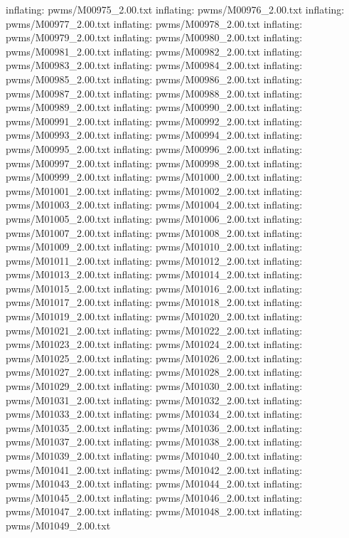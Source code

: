 \documentclass[letterpaper,10pt,english]{sphinxmanual}
\begin{document}
{\begin{sphinxVerbatim}[commandchars=\\\{\}]
  inflating: pwms/M00975\_2.00.txt
  inflating: pwms/M00976\_2.00.txt
  inflating: pwms/M00977\_2.00.txt
  inflating: pwms/M00978\_2.00.txt
  inflating: pwms/M00979\_2.00.txt
  inflating: pwms/M00980\_2.00.txt
  inflating: pwms/M00981\_2.00.txt
  inflating: pwms/M00982\_2.00.txt
  inflating: pwms/M00983\_2.00.txt
  inflating: pwms/M00984\_2.00.txt
  inflating: pwms/M00985\_2.00.txt
  inflating: pwms/M00986\_2.00.txt
  inflating: pwms/M00987\_2.00.txt
  inflating: pwms/M00988\_2.00.txt
  inflating: pwms/M00989\_2.00.txt
  inflating: pwms/M00990\_2.00.txt
  inflating: pwms/M00991\_2.00.txt
  inflating: pwms/M00992\_2.00.txt
  inflating: pwms/M00993\_2.00.txt
  inflating: pwms/M00994\_2.00.txt
  inflating: pwms/M00995\_2.00.txt
  inflating: pwms/M00996\_2.00.txt
  inflating: pwms/M00997\_2.00.txt
  inflating: pwms/M00998\_2.00.txt
  inflating: pwms/M00999\_2.00.txt
  inflating: pwms/M01000\_2.00.txt
  inflating: pwms/M01001\_2.00.txt
  inflating: pwms/M01002\_2.00.txt
  inflating: pwms/M01003\_2.00.txt
  inflating: pwms/M01004\_2.00.txt
  inflating: pwms/M01005\_2.00.txt
  inflating: pwms/M01006\_2.00.txt
  inflating: pwms/M01007\_2.00.txt
  inflating: pwms/M01008\_2.00.txt
  inflating: pwms/M01009\_2.00.txt
  inflating: pwms/M01010\_2.00.txt
  inflating: pwms/M01011\_2.00.txt
  inflating: pwms/M01012\_2.00.txt
  inflating: pwms/M01013\_2.00.txt
  inflating: pwms/M01014\_2.00.txt
  inflating: pwms/M01015\_2.00.txt
  inflating: pwms/M01016\_2.00.txt
  inflating: pwms/M01017\_2.00.txt
  inflating: pwms/M01018\_2.00.txt
  inflating: pwms/M01019\_2.00.txt
  inflating: pwms/M01020\_2.00.txt
  inflating: pwms/M01021\_2.00.txt
  inflating: pwms/M01022\_2.00.txt
  inflating: pwms/M01023\_2.00.txt
  inflating: pwms/M01024\_2.00.txt
  inflating: pwms/M01025\_2.00.txt
  inflating: pwms/M01026\_2.00.txt
  inflating: pwms/M01027\_2.00.txt
  inflating: pwms/M01028\_2.00.txt
  inflating: pwms/M01029\_2.00.txt
  inflating: pwms/M01030\_2.00.txt
  inflating: pwms/M01031\_2.00.txt
  inflating: pwms/M01032\_2.00.txt
  inflating: pwms/M01033\_2.00.txt
  inflating: pwms/M01034\_2.00.txt
  inflating: pwms/M01035\_2.00.txt
  inflating: pwms/M01036\_2.00.txt
  inflating: pwms/M01037\_2.00.txt
  inflating: pwms/M01038\_2.00.txt
  inflating: pwms/M01039\_2.00.txt
  inflating: pwms/M01040\_2.00.txt
  inflating: pwms/M01041\_2.00.txt
  inflating: pwms/M01042\_2.00.txt
  inflating: pwms/M01043\_2.00.txt
  inflating: pwms/M01044\_2.00.txt
  inflating: pwms/M01045\_2.00.txt
  inflating: pwms/M01046\_2.00.txt
  inflating: pwms/M01047\_2.00.txt
  inflating: pwms/M01048\_2.00.txt
  inflating: pwms/M01049\_2.00.txt

\end{sphinxVerbatim}}
\end{document}
